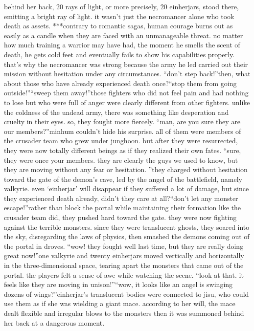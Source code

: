 behind her back, 20 rays of light, or more precisely, 20 einherjars, stood there, emitting a bright ray of light.
 it wasn’t just the necromancer alone who took death as assets.
***contrary to romantic sagas, human courage burns out as easily as a candle when they are faced with an unmanageable threat.
 no matter how much training a warrior may have had, the moment he smells the scent of death, he gets cold feet and eventually fails to show his capabilities properly.
that’s why the necromancer was strong because the army he led carried out their mission without hesitation under any circumstances.
“don’t step back!”then, what about those who have already experienced death once?“stop them from going outside!”“sweep them away!”those fighters who did not feel pain and had nothing to lose but who were full of anger were clearly different from other fighters.
unlike the coldness of the undead army, there was something like desperation and cruelty in their eyes.
 so, they fought more fiercely.
“man, are you sure they are our members?”minhum couldn’t hide his surprise.
 all of them were members of the crusader team who grew under junghoon.
but after they were resurrected, they were now totally different beings as if they realized their own fates.
“sure, they were once your members.
 they are clearly the guys we used to know, but they are moving without any fear or hesitation.
”they charged without hesitation toward the gate of the demon’s cave, led by the angel of the battlefield, namely valkyrie.
even ‘einherjar’ will disappear if they suffered a lot of damage, but since they experienced death already, didn’t they care at all?“don’t let any monster escape!”rather than block the portal while maintaining their formation like the crusader team did, they pushed hard toward the gate.
 they were now fighting against the terrible monsters.
since they were translucent ghosts, they soared into the sky, disregarding the laws of physics, then smashed the demons coming out of the portal in droves.
“wow! they fought well last time, but they are really doing great now!”one valkyrie and twenty einherjars moved vertically and horizontally in the three-dimensional space, tearing apart the monsters that came out of the portal.
the players felt a sense of awe while watching the scene.
“look at that.
 it feels like they are moving in unison!”“wow, it looks like an angel is swinging dozens of wings?”einherjar’s translucent bodies were connected to jisu, who could use them as if she was wielding a giant mace.
 according to her will, the mace dealt flexible and irregular blows to the monsters then it was summoned behind her back at a dangerous moment.
